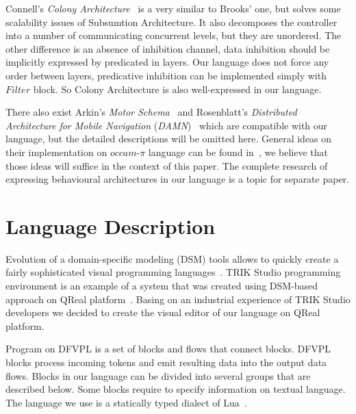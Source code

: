 \documentclass[conference,compsoc]{IEEEtran}
\begin{document}
Connell's \textit{Colony Architecture}~\cite{connell1989colony} is a very similar to Brooks' one, but solves some scalability issues of Subsumtion Architecture. It also decomposes the controller into a number of communicating concurrent levels, but they are unordered. The other difference is an absence of inhibition channel, data inhibition should be implicitly expressed by predicated in layers. Our language does not force any order between layers, predicative inhibition can be implemented simply with $Filter$ block. So Colony Architecture is also well-expressed in our language.

There also exist Arkin’s \textit{Motor Schema}~\cite{arkin1987motor} and Rosenblatt’s \textit{Distributed Architecture for Mobile Navigation} (\textit{DAMN})~\cite{rosenblatt1997damn} which are compatible with our language, but the detailed descriptions will be omitted here. General ideas on their implementation on $occam\mbox{-}\pi$ language can be found in~\cite{simpson2009toward}, we believe that those ideas will suffice in the context of this paper. The complete research of expressing behavioural architectures in our language is a topic for separate paper.


\section{Language Description}
\label{sec:lang}

Evolution of a domain-specific modeling (DSM) tools allows to quickly create a fairly sophisticated visual programming languages~\cite{koznov2008}. TRIK Studio programming environment is an example of a system that was created using DSM-based approach on QReal platform~\cite{qrealMeta, kuzenkova2013qreal}. Basing on an industrial experience of TRIK Studio developers we decided to create the visual editor of our language on QReal platform.

Program on DFVPL is a set of blocks and flows that connect blocks. DFVPL blocks process incoming tokens and emit resulting data into the output data flows. Blocks in our language can be divided into several groups that are described below. Some blocks require to specify information on textual language. The language we use is a statically typed dialect of Lua~\cite{lua}.
\end{document}
